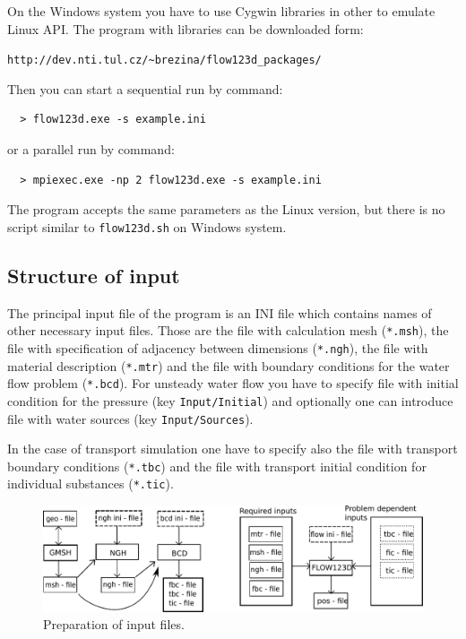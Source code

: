 \documentclass[12pt,a4paper]{report}
\begin{document}
On the Windows system you have to use Cygwin libraries in other to emulate Linux API. The program with libraries can be downloaded form:

\verb'http://dev.nti.tul.cz/~brezina/flow123d_packages/'

Then you can start a sequential run by command:
\begin{verbatim}
  > flow123d.exe -s example.ini
\end{verbatim}
or a parallel run by command:
\begin{verbatim}
  > mpiexec.exe -np 2 flow123d.exe -s example.ini
\end{verbatim}
The program accepts the same parameters as the Linux version, but there is no script similar to \verb'flow123d.sh' on Windows system.


\subsection{Structure of input}

The principal input file of the program is an INI file which contains names of other necessary input files.
Those are the file with calculation mesh (\verb'*.msh'), the file with specification of adjacency between dimensions (\verb'*.ngh'),
the file with material description (\verb'*.mtr') and the file with boundary conditions for the water flow problem (\verb'*.bcd').
For unsteady water flow you have to specify file with initial condition for the pressure (key \verb'Input/Initial') and optionally one can introduce 
file with water sources (key \verb'Input/Sources').

In the case of transport simulation one have to specify also the file with transport boundary conditions (\verb'*.tbc') 
and the file with transport initial condition
for individual substances (\verb'*.tic').

 \begin{figure}[h]
    \begin{center}
      \includegraphics[scale=0.7]{schema.pdf} %
      \caption{Preparation of input files.}
      \label{obr3}
    \end{center}
  \end{figure}
\end{document}
